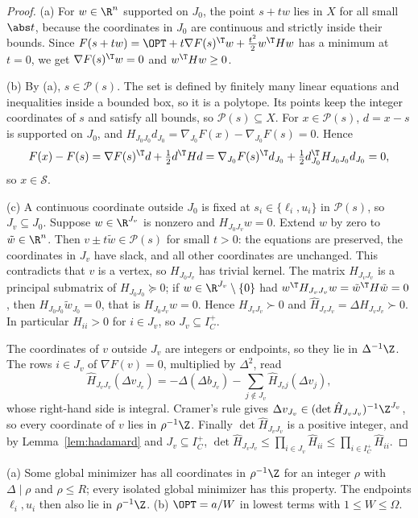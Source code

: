 \begin{proof}
(a) For $w\in\R^n$ supported on $J_0$, the point $s+tw$ lies in $X$ for all
small $\abs t$, because the coordinates in $J_0$ are continuous and strictly
inside their bounds. Since
$F(s+tw)=\OPT+t\nabla F(s)^{\T}w+\frac{t^2}2w^{\T}Hw$ has a minimum at $t=0$,
we get $\nabla F(s)^{\T}w=0$ and $w^{\T}Hw\ge0$.

(b) By (a), $s\in\mathcal P(s)$. The set is defined by finitely many linear
equations and inequalities inside a bounded box, so it is a polytope. Its
points keep the integer coordinates of $s$ and satisfy all bounds, so
$\mathcal P(s)\subseteq X$. For $x\in\mathcal P(s)$, $d=x-s$ is supported on
$J_0$, and $H_{J_0J_0}d_{J_0}=\nabla_{J_0}F(x)-\nabla_{J_0}F(s)=0$. Hence
\[
F(x)-F(s)=\nabla F(s)^{\T}d+\tfrac12d^{\T}Hd
=\nabla_{J_0}F(s)^{\T}d_{J_0}+\tfrac12d_{J_0}^{\T}H_{J_0J_0}d_{J_0}=0 ,
\]
so $x\in\mathcal S$.

(c) A continuous coordinate outside $J_0$ is fixed at $s_i\in\{\ell_i,u_i\}$
in $\mathcal P(s)$, so $J_v\subseteq J_0$. Suppose $w\in\R^{J_v}$ is nonzero and
$H_{J_0J_v}w=0$. Extend $w$ by zero to $\tilde w\in\R^n$. Then
$v\pm t\tilde w\in\mathcal P(s)$ for small $t>0$: the equations are preserved,
the coordinates in $J_v$ have slack, and all other coordinates are unchanged.
This contradicts that $v$ is a vertex, so $H_{J_0J_v}$ has trivial kernel. The
matrix $H_{J_vJ_v}$ is a principal submatrix of $H_{J_0J_0}\succeq0$; if
$w\in\R^{J_v}\setminus\{0\}$ had $w^{\T}H_{J_vJ_v}w=\tilde w^{\T}H\tilde w=0$, then
$H_{J_0J_0}\tilde w_{J_0}=0$, that is $H_{J_0J_v}w=0$. Hence $H_{J_vJ_v}\succ0$ and
$\hat H_{J_vJ_v}=\Delta H_{J_vJ_v}\succ0$. In particular $H_{ii}>0$ for $i\in J_v$, so
$J_v\subseteq I_C^+$.

The coordinates of $v$ outside $J_v$ are integers or endpoints, so they lie in
$\Delta^{-1}\Z$. The rows $i\in J_v$ of $\nabla F(v)=0$, multiplied by
$\Delta^2$, read
\[
\hat H_{J_vJ_v}(\Delta v_{J_v})=-\Delta(\Delta b_{J_v})-\sum_{j\notin J_v}\hat H_{J_vj}(\Delta v_j),
\]
whose right-hand side is integral. Cramer's rule gives
$\Delta v_{J_v}\in(\det\hat H_{J_vJ_v})^{-1}\Z^{J_v}$, so every coordinate of $v$ lies in
$\rho^{-1}\Z$. Finally $\det\hat H_{J_vJ_v}$ is a positive integer, and by
Lemma~\ref{lem:hadamard} and $J_v\subseteq I_C^+$,
$\det\hat H_{J_vJ_v}\le\prod_{i\in J_v}\hat H_{ii}\le\prod_{i\in I_C^+}\hat H_{ii}$.
\end{proof}

\begin{corollary}\label{cor:height}
(a) Some global minimizer has all coordinates in $\rho^{-1}\Z$ for an integer
$\rho$ with $\Delta\mid\rho$ and $\rho\le R$; every isolated global minimizer
has this property. The endpoints $\ell_i,u_i$ then also lie in $\rho^{-1}\Z$.
(b) $\OPT=a/W$ in lowest terms with $1\le W\le \Omega$.
\end{corollary}

